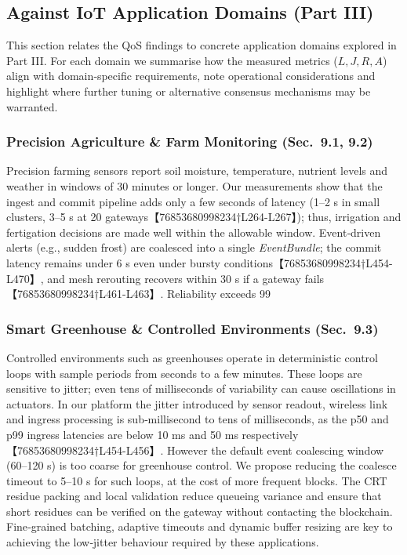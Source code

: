 \subsection{Against IoT Application Domains (Part III)}
\label{subsec:domains}

This section relates the QoS findings to concrete application domains explored in Part III.  For each domain we summarise how the measured metrics (\(L,J,R,A\)) align with domain‑specific requirements, note operational considerations and highlight where further tuning or alternative consensus mechanisms may be warranted.

\subsubsection{Precision Agriculture \& Farm Monitoring (Sec.~9.1, 9.2)}
Precision farming sensors report soil moisture, temperature, nutrient levels and weather in windows of 30 minutes or longer.  Our measurements show that the ingest and commit pipeline adds only a few seconds of latency (1–2 s in small clusters, 3–5 s at 20 gateways【76853680998234†L264-L267】); thus, irrigation and fertigation decisions are made well within the allowable window.  Event‑driven alerts (e.g., sudden frost) are coalesced into a single \emph{EventBundle}; the commit latency remains under 6 s even under bursty conditions【76853680998234†L454-L470】, and mesh rerouting recovers within 30 s if a gateway fails【76853680998234†L461-L463】.  Reliability exceeds 99 %

\subsubsection{Smart Greenhouse \& Controlled Environments (Sec.~9.3)}
Controlled environments such as greenhouses operate in deterministic control loops with sample periods from seconds to a few minutes.  These loops are sensitive to jitter; even tens of milliseconds of variability can cause oscillations in actuators.  In our platform the jitter introduced by sensor readout, wireless link and ingress processing is sub‑millisecond to tens of milliseconds, as the p50 and p99 ingress latencies are below 10 ms and 50 ms respectively【76853680998234†L454-L456】.  However the default event coalescing window (60–120 s) is too coarse for greenhouse control.  We propose reducing the coalesce timeout to 5–10 s for such loops, at the cost of more frequent blocks.  The CRT residue packing and local validation reduce queueing variance and ensure that short residues can be verified on the gateway without contacting the blockchain.  Fine‑grained batching, adaptive timeouts and dynamic buffer resizing are key to achieving the low‑jitter behaviour required by these applications.

